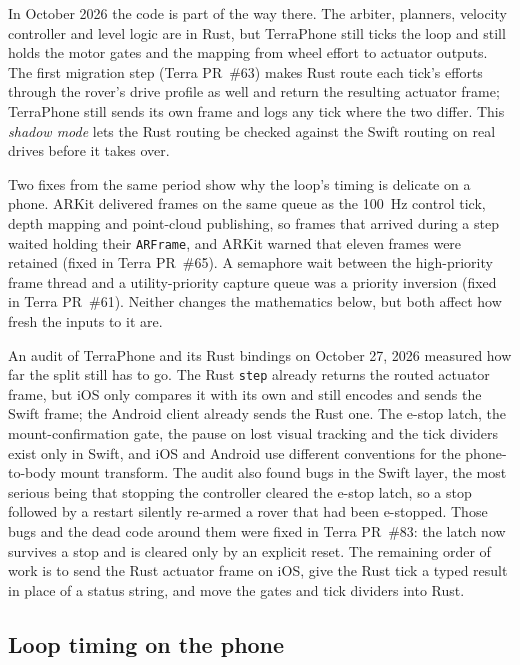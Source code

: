 In October 2026 the code is part of the way there.
The arbiter, planners, velocity controller and level logic are in Rust, but TerraPhone still ticks the loop and still holds the motor gates and the mapping from wheel effort to actuator outputs.
The first migration step (Terra PR~\#63) makes Rust route each tick's efforts through the rover's drive profile as well and return the resulting actuator frame; TerraPhone still sends its own frame and logs any tick where the two differ.
This \emph{shadow mode} lets the Rust routing be checked against the Swift routing on real drives before it takes over.

Two fixes from the same period show why the loop's timing is delicate on a phone.
ARKit delivered frames on the same queue as the 100~Hz control tick, depth mapping and point-cloud publishing, so frames that arrived during a step waited holding their \texttt{ARFrame}, and ARKit warned that eleven frames were retained (fixed in Terra PR~\#65).
A semaphore wait between the high-priority frame thread and a utility-priority capture queue was a priority inversion (fixed in Terra PR~\#61).
Neither changes the mathematics below, but both affect how fresh the inputs to it are.

An audit of TerraPhone and its Rust bindings on October 27, 2026 measured how far the split still has to go.
The Rust \texttt{step} already returns the routed actuator frame, but iOS only compares it with its own and still encodes and sends the Swift frame; the Android client already sends the Rust one.
The e-stop latch, the mount-confirmation gate, the pause on lost visual tracking and the tick dividers exist only in Swift, and iOS and Android use different conventions for the phone-to-body mount transform.
The audit also found bugs in the Swift layer, the most serious being that stopping the controller cleared the e-stop latch, so a stop followed by a restart silently re-armed a rover that had been e-stopped.
Those bugs and the dead code around them were fixed in Terra PR~\#83: the latch now survives a stop and is cleared only by an explicit reset.
The remaining order of work is to send the Rust actuator frame on iOS, give the Rust tick a typed result in place of a status string, and move the gates and tick dividers into Rust.

\subsection{Loop timing on the phone}
\label{sec:arch-timing}

